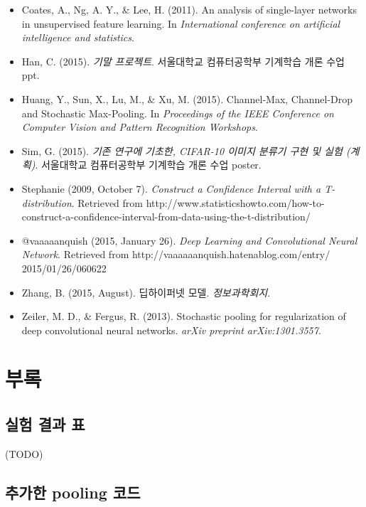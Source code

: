 \documentclass[a4paper,9pt]{article}
\begin{document}
\begin{multicols*}{2}
\begin{itemize}
\item Coates, A., Ng, A. Y., \& Lee, H. (2011). An analysis of single-layer networks in unsupervised feature learning. In \textit{International conference on artificial intelligence and statistics}.
\item Han, C. (2015). \textit{기말 프로젝트}. 서울대학교 컴퓨터공학부 기계학습 개론 수업 ppt.
\item Huang, Y., Sun, X., Lu, M., \& Xu, M. (2015). Channel-Max, Channel-Drop and Stochastic Max-Pooling. In \textit{Proceedings of the IEEE Conference on Computer Vision and Pattern Recognition Workshops}.
\item Sim, G. (2015). \textit{기존 연구에 기초한, CIFAR-10 이미지 분류기 구현 및 실험 (계획)}. 서울대학교 컴퓨터공학부 기계학습 개론 수업 poster.
\item Stephanie (2009, October 7). \textit{Construct a Confidence Interval with a T-distribution}. Retrieved from http://www.statisticshowto.com/how-to-construct-a-confidence-interval-from-data-using-the-t-distribution/
\item @vaaaaanquish (2015, January 26). \textit{Deep Learning and Convolutional Neural Network}. Retrieved from http://vaaaaaanquish.hatenablog.com/entry/ 2015/01/26/060622
\item Zhang, B. (2015, August). 딥하이퍼넷 모델. \textit{정보과학회지}.
\item Zeiler, M. D., \& Fergus, R. (2013). Stochastic pooling for regularization of deep convolutional neural networks. \textit{arXiv preprint arXiv:1301.3557}.
\end{itemize}

\end{multicols*}

\pagebreak

\section*{부록}

\subsection*{실험 결과 표}

(TODO)

\subsection*{추가한 pooling 코드}
\end{document}
